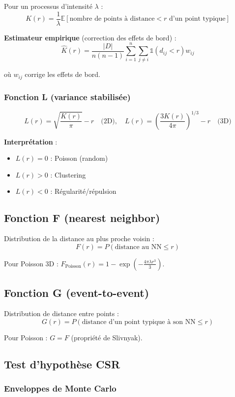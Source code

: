 Pour un processus d'intensité $\lambda$ :
\[
K(r) = \frac{1}{\lambda} \mathbb{E}[\text{nombre de points à distance} < r \text{ d'un point typique}]
\]

\textbf{Estimateur empirique} (correction des effets de bord) :
\[
\hat{K}(r) = \frac{|D|}{n(n-1)} \sum_{i=1}^n \sum_{j \neq i} \mathbb{1}(d_{ij} < r) w_{ij}
\]

où $w_{ij}$ corrige les effets de bord.

\subsubsection{Fonction L (variance stabilisée)}

\[
L(r) = \sqrt{\frac{K(r)}{\pi}} - r \quad \text{(2D)}, \quad L(r) = \left(\frac{3K(r)}{4\pi}\right)^{1/3} - r \quad \text{(3D)}
\]

\textbf{Interprétation} :
\begin{itemize}
    \item $L(r) = 0$ : Poisson (random)
    \item $L(r) > 0$ : Clustering
    \item $L(r) < 0$ : Régularité/répulsion
\end{itemize}

\subsection{Fonction F (nearest neighbor)}

Distribution de la distance au plus proche voisin :
\[
F(r) = P(\text{distance au NN} \leq r)
\]

Pour Poisson 3D : $F_{\text{Poisson}}(r) = 1 - \exp\left(-\frac{4\pi\lambda r^3}{3}\right)$.

\subsection{Fonction G (event-to-event)}

Distribution de distance entre points :
\[
G(r) = P(\text{distance d'un point typique à son NN} \leq r)
\]

Pour Poisson : $G = F$ (propriété de Slivnyak).

\subsection{Test d'hypothèse CSR}

\subsubsection{Enveloppes de Monte Carlo}

